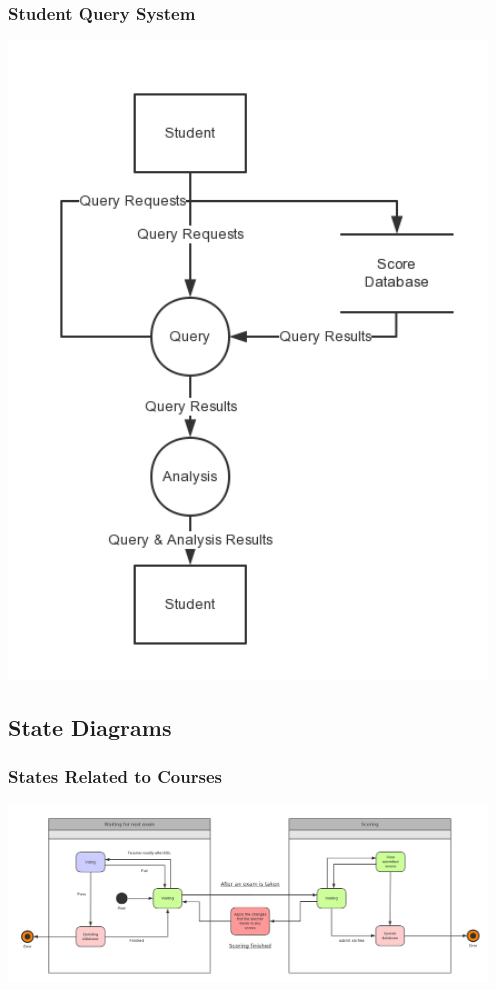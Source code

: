 \documentclass[a4]{article}
\begin{document}
\subsubsection{Student Query System}
\includegraphics[width=5in]{pic/2-4.png}

\subsection{State Diagrams}
\subsubsection{States Related to Courses}
\includegraphics[width=5in]{pic/3-1.png}
\end{document}
